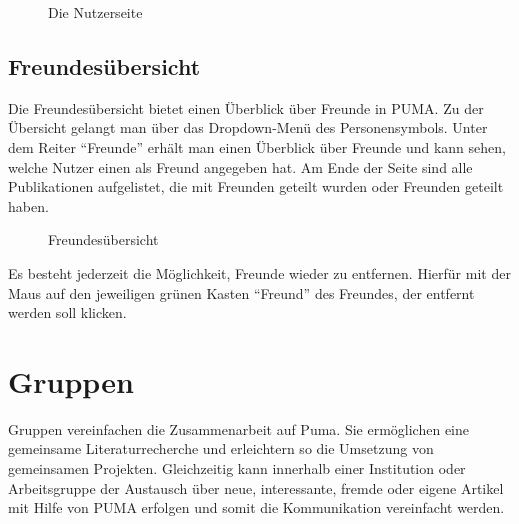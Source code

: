 \begin{figure}[h!]
 \centering
 \caption{Die Nutzerseite}
 \label{fig:nutzerseite}
\end{figure}

\subsection{Freundesübersicht}
\label{subsec:freundesuebersicht}
Die Freundesübersicht bietet einen Überblick über Freunde in PUMA. Zu der Übersicht gelangt man über das Dropdown-Menü des Personensymbols. Unter dem Reiter \enquote{Freunde} erhält man einen Überblick über Freunde und kann sehen, welche Nutzer einen als Freund angegeben hat. Am Ende der Seite sind alle Publikationen aufgelistet, die mit Freunden geteilt wurden oder Freunden geteilt haben.\newline

\begin{figure}[h!]
 \centering
 \caption{Freundesübersicht}
 \label{fig:freundesuebersicht}
\end{figure}

Es besteht jederzeit die Möglichkeit, Freunde wieder zu entfernen. Hierfür mit der Maus auf den jeweiligen grünen Kasten \enquote{Freund} des Freundes, der entfernt werden soll klicken.

\section{Gruppen}
\label{sec:gruppen}
Gruppen vereinfachen die Zusammenarbeit auf Puma. Sie ermöglichen eine gemeinsame Literaturrecherche und erleichtern so die Umsetzung von gemeinsamen Projekten. Gleichzeitig kann innerhalb einer Institution oder Arbeitsgruppe der Austausch über neue, interessante, fremde oder eigene Artikel mit Hilfe von PUMA erfolgen und somit die Kommunikation vereinfacht werden.

